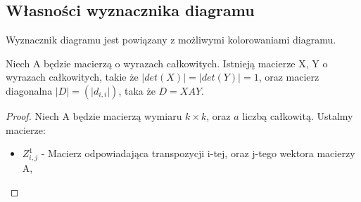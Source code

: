\subsection{Własności wyznacznika diagramu}
Wyznacznik diagramu jest powiązany z możliwymi kolorowaniami diagramu.

\begin{lemat}
Niech A będzie macierzą o wyrazach całkowitych. Istnieją macierze X, Y o wyrazach całkowitych, takie że $\vert det(X) \vert= \vert det(Y) \vert=1$, oraz macierz diagonalna $\vert D \vert=(\vert d_{i,i} \vert)$, taka że $D=XAY$.
\end{lemat}
\begin{proof}
Niech A będzie macierzą wymiaru $k \times k$, oraz  $a$ liczbą całkowitą. Ustalmy macierze:
\begin{itemize}
\item $Z^1_{i,j}$  -  Macierz odpowiadająca transpozycji i-tej, oraz j-tego wektora macierzy A,


\end{itemize}
\end{proof}
